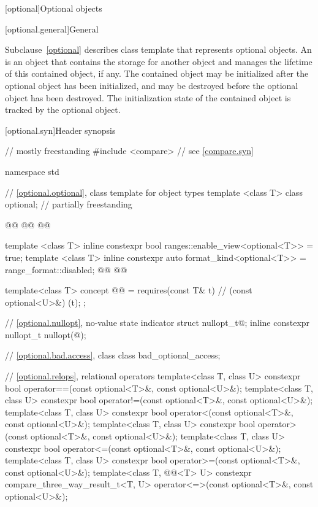 [optional]{Optional objects}

[optional.general]{General}

\pnum
Subclause~\ref{optional} describes class template  that represents
optional objects.
An  is an
object that contains the storage for another object and manages the lifetime of
this contained object, if any. The contained object may be initialized after
the optional object has been initialized, and may be destroyed before the
optional object has been destroyed. The initialization state of the contained
object is tracked by the optional object.

[optional.syn]{Header  synopsis}

%
\begin{codeblock}
// mostly freestanding
#include <compare>              // see \ref{compare.syn}

namespace std {
  // \ref{optional.optional}, class template  for object types
  template <class T>
  class optional; // partially freestanding

  @@
  @@
  @@

  template <class T>
  inline constexpr bool ranges::enable_view<optional<T>> = true;
  template <class T>
  inline constexpr auto format_kind<optional<T>> = range_format::disabled;
  @@
  @@

  template<class T>
    concept @@ = requires(const T& t) {       // (const optional<U>&){ }(t);
    };

  // \ref{optional.nullopt}, no-value state indicator
  struct nullopt_t{@\seebelow@};
  inline constexpr nullopt_t nullopt(@\unspec@);

  // \ref{optional.bad.access}, class 
  class bad_optional_access;

  // \ref{optional.relops}, relational operators
  template<class T, class U>
    constexpr bool operator==(const optional<T>&, const optional<U>&);
  template<class T, class U>
    constexpr bool operator!=(const optional<T>&, const optional<U>&);
  template<class T, class U>
    constexpr bool operator<(const optional<T>&, const optional<U>&);
  template<class T, class U>
    constexpr bool operator>(const optional<T>&, const optional<U>&);
  template<class T, class U>
    constexpr bool operator<=(const optional<T>&, const optional<U>&);
  template<class T, class U>
    constexpr bool operator>=(const optional<T>&, const optional<U>&);
  template<class T, @@<T> U>
    constexpr compare_three_way_result_t<T, U>
      operator<=>(const optional<T>&, const optional<U>&);

}
\end{codeblock}
